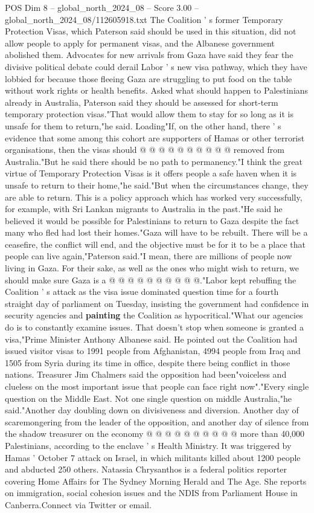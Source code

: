 \begin{textsample}{POS Dim 8 – global\_north\_2024\_08 – Score 3.00 – global\_north\_2024\_08/112605918.txt}
The Coalition ' s former Temporary Protection Visas, which Paterson said should be used in this situation, did not allow people to apply for permanent visas, and the Albanese government abolished them.
Advocates for new arrivals from Gaza have said they fear the divisive political debate could derail Labor ' s new visa pathway, which they have lobbied for because those fleeing Gaza are struggling to put food on the table without work rights or health benefits.
Asked what should happen to Palestinians already in Australia, Paterson said they should be assessed for short-term temporary protection visas."That would allow them to stay for so long as it is unsafe for them to return,"he said.
Loading"If, on the other hand, there ' s evidence that some among this cohort are supporters of Hamas or other terrorist organisations, then the visas should @ @ @ @ @ @ @ @ @ @ removed from Australia."But he said there should be no path to permanency."I think the great virtue of Temporary Protection Visas is it offers people a safe haven when it is unsafe to return to their home,"he said."But when the circumstances change, they are able to return.
This is a policy approach which has worked very successfully, for example, with Sri Lankan migrants to Australia in the past."He said he believed it would be possible for Palestinians to return to Gaza despite the fact many who fled had lost their homes."Gaza will have to be rebuilt.
There will be a ceasefire, the conflict will end, and the objective must be for it to be a place that people can live again,"Paterson said."I mean, there are millions of people now living in Gaza.
For their sake, as well as the ones who might wish to return, we should make sure Gaza is a @ @ @ @ @ @ @ @ @ @."Labor kept rebuffing the Coalition ' s attack as the visa issue dominated question time for a fourth straight day of parliament on Tuesday, insisting the government had confidence in security agencies and \textbf{painting} the Coalition as hypocritical."What our agencies do is to constantly examine issues.
That doesn't stop when someone is granted a visa,"Prime Minister Anthony Albanese said.
He pointed out the Coalition had issued visitor visas to 1991 people from Afghanistan, 4994 people from Iraq and 1505 from Syria during its time in office, despite there being conflict in those nations.
Treasurer Jim Chalmers said the opposition had been"voiceless and clueless on the most important issue that people can face right now"."Every single question on the Middle East.
Not one single question on middle Australia,"he said."Another day doubling down on divisiveness and diversion.
Another day of scaremongering from the leader of the opposition, and another day of silence from the shadow treasurer on the economy @ @ @ @ @ @ @ @ @ @ more than 40,000 Palestinians, according to the enclave ' s Health Ministry.
It was triggered by Hamas ' October 7 attack on Israel, in which militants killed about 1200 people and abducted 250 others.
Natassia Chrysanthos is a federal politics reporter covering Home Affairs for The Sydney Morning Herald and The Age.
She reports on immigration, social cohesion issues and the NDIS from Parliament House in Canberra.Connect via Twitter or email.


\end{textsample}
